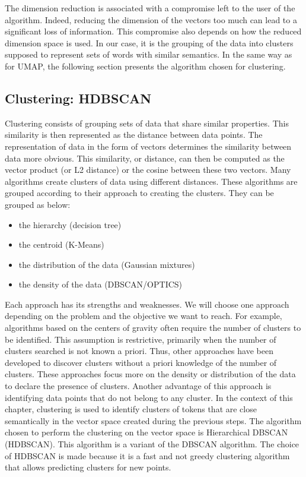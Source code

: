 The dimension reduction is associated with a compromise left to the user of the algorithm.
Indeed, reducing the dimension of the vectors too much can lead to a significant loss of information.
This compromise also depends on how the reduced dimension space is used.
In our case, it is the grouping of the data into clusters supposed to represent sets of words with similar semantics.
In the same way as for UMAP, the following section presents the algorithm chosen for clustering.

\subsection{Clustering: HDBSCAN}
Clustering consists of grouping sets of data that share similar properties.
This similarity is then represented as the distance between data points.
The representation of data in the form of vectors determines the similarity between data more obvious.
This similarity, or distance, can then be computed as the vector product (or L2 distance) or the cosine between these two vectors.
Many algorithms create clusters of data using different distances.
These algorithms are grouped according to their approach to creating the clusters.
They can be grouped as below:

\begin{itemize}
    \item the hierarchy (decision tree)
    \item the centroid (K-Means)
    \item the distribution of the data (Gaussian mixtures)
    \item the density of the data (DBSCAN/OPTICS)
\end{itemize}

Each approach has its strengths and weaknesses.
We will choose one approach depending on the problem and the objective we want to reach.
For example, algorithms based on the centers of gravity often require the number of clusters to be identified.
This assumption is restrictive, primarily when the number of clusters searched is not known a priori.
Thus, other approaches have been developed to discover clusters without a priori knowledge of the number of clusters.
These approaches focus more on the density or distribution of the data to declare the presence of clusters.
Another advantage of this approach is identifying data points that do not belong to any cluster.
In the context of this chapter, clustering is used to identify clusters of tokens that
are close semantically in the vector space created during the previous steps.
The algorithm chosen to perform the clustering on the vector space is Hierarchical DBSCAN (HDBSCAN).
This algorithm is a variant of the DBSCAN algorithm.
The choice of HDBSCAN is made because it is a fast and not greedy clustering algorithm that allows predicting clusters for new points.

